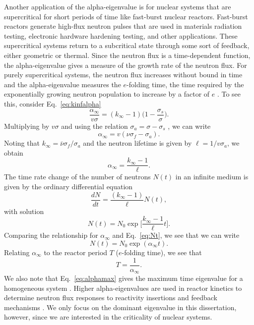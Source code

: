 
Another application of the alpha-eigenvalue is for nuclear systems that are supercritical for short periods of time like fast-burst nuclear reactors. Fast-burst reactors generate high-flux neutron pulses that are used in materials radiation testing, electronic hardware hardening testing, and other applications. These supercritical systems return to a subcritical state through some sort of feedback, either geometric or thermal. Since the neutron flux is a time-dependent function, the alpha-eigenvalue gives a measure of the growth rate of the neutron flux. For purely supercritical systems, the neutron flux increases without bound in time and the alpha-eigenvalue measures the $e$-folding time, the time required by the exponentially growing neutron population to increase by a factor of $e$ \cite{duderstadt_nuclear_1976}. To see this, consider Eq.~\ref{eq:kinfalpha}
\begin{equation*}
	\frac{\alpha_{\infty}}{v\sigma} = (k_{\infty}-1) \bigg ( 1 - \frac{\sigma_{s}}{\sigma} \bigg ).
\end{equation*}
Multiplying by $v\sigma$ and using the relation $\sigma_{a} = \sigma - \sigma_{s}$ , we can write
\begin{equation}
	\alpha_{\infty} = v(\nu \sigma_{f} - \sigma_{a}).
\end{equation}
Noting that $k_{\infty} = \bar{\nu} \sigma_{f} / \sigma_{a}$ and the neutron lifetime is given by $\ell = 1/v\sigma_{a}$, we obtain
\begin{equation}
	\alpha_{\infty} = \frac{k_{\infty} - 1}{\ell}.
	\label{eq:alphamax}
\end{equation}
The time rate change of the number of neutrons $N(t)$ in an infinite medium is given by the ordinary differential equation
\begin{equation}
\frac{dN}{dt} = \frac{(k_{\infty} - 1)}{\ell} N(t),
\end{equation}
with solution
\begin{equation}
	N(t) = N_{0} \exp \bigg [ \frac{k_{\infty}-1}{\ell} t \bigg ].
	\label{eq:Nt}
\end{equation}
Comparing the relationship for $\alpha_{\infty}$ and Eq.~\ref{eq:Nt}, we see that we can write
\begin{equation}
	N(t) = N_{0} \exp (\alpha_{\infty} t).
\end{equation}
Relating $\alpha_{\infty}$ to the reactor period $T$ ($e$-folding time), we see that
\begin{equation}
	T = \frac{1}{\alpha_{\infty}}.
\end{equation}
We also note that Eq.~\ref{eq:alphamax} gives the maximum time eigenvalue for a homogeneous system \cite{kornreich_timeeigenvalue_2005}. Higher alpha-eigenvalues are used in reactor kinetics to determine neutron flux responses to reactivity insertions and feedback mechanisms \cite{modak_scheme_2007}. We only focus on the dominant eigenvalue in this dissertation, however, since we are interested in the criticality of nuclear systems.

